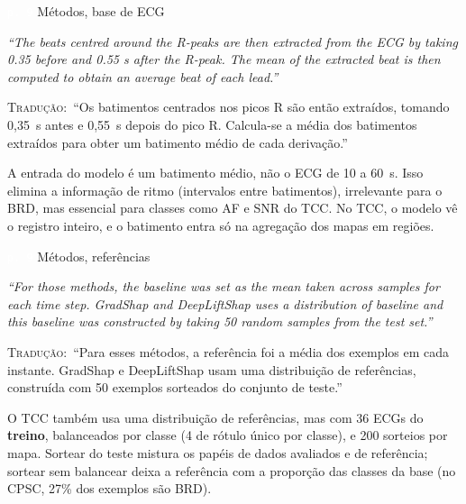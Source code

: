 \documentclass[11pt,a4paper]{article}
\newcommand{\pagechip}[1]{{\setlength{\fboxsep}{1.5pt}\colorbox{cAcc}{\textcolor{white}{\scriptsize\texttt{#1}}}}}
\newenvironment{origquote}{\par\itshape\small}{\par}
\newenvironment{tradquote}{\par\small\textsc{Tradução:}\ }{\par}
\newcommand{\explab}[1]{\par\smallskip{\small\color{cAcc}\textbf{\MakeUppercase{#1}}}\par}
\begin{document}
\begin{citacard}{\pagechip{p. 9} Métodos, base de ECG}
\begin{origquote}“The beats centred around the R-peaks are then extracted from the ECG by taking 0.35 before and 0.55 s after the R-peak. The mean of the extracted beat is then computed to obtain an average beat of each lead.”\end{origquote}
\begin{tradquote}“Os batimentos centrados nos picos R são então extraídos, tomando 0,35~s antes e 0,55~s depois do pico R. Calcula-se a média dos batimentos extraídos para obter um batimento médio de cada derivação.”\end{tradquote}
\explab{Explicação}
A entrada do modelo é um batimento médio, não o ECG de 10 a 60~s. Isso elimina a informação de ritmo (intervalos entre batimentos), irrelevante para o BRD, mas essencial para classes como AF e SNR do TCC. No TCC, o modelo vê o registro inteiro, e o batimento entra só na agregação dos mapas em regiões.
\end{citacard}

\begin{citacard}{\pagechip{p. 9} Métodos, referências}
\begin{origquote}“For those methods, the baseline was set as the mean taken across samples for each time step. GradShap and DeepLiftShap uses a distribution of baseline and this baseline was constructed by taking 50 random samples from the test set.”\end{origquote}
\begin{tradquote}“Para esses métodos, a referência foi a média dos exemplos em cada instante. GradShap e DeepLiftShap usam uma distribuição de referências, construída com 50 exemplos sorteados do conjunto de teste.”\end{tradquote}
\explab{Explicação}
O TCC também usa uma distribuição de referências, mas com 36 ECGs do \textbf{treino}, balanceados por classe (4 de rótulo único por classe), e 200 sorteios por mapa. Sortear do teste mistura os papéis de dados avaliados e de referência; sortear sem balancear deixa a referência com a proporção das classes da base (no CPSC, 27\% dos exemplos são BRD).
\end{citacard}
\end{document}
